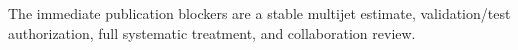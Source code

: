 The immediate publication blockers are a stable multijet estimate, validation/test authorization, full systematic treatment, and collaboration review.
